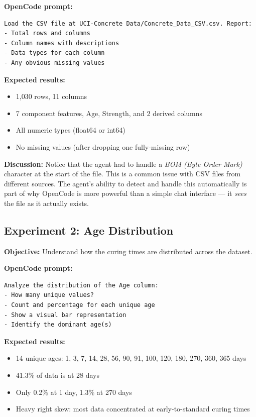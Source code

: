 \documentclass[11pt]{article}
\begin{document}
\textbf{OpenCode prompt:}
\begin{lstlisting}[style=term]
Load the CSV file at UCI-Concrete Data/Concrete_Data_CSV.csv. Report:
- Total rows and columns
- Column names with descriptions
- Data types for each column
- Any obvious missing values
\end{lstlisting}

\textbf{Expected results:}
\begin{itemize}[nosep]
  \item 1,030 rows, 11 columns
  \item 7 component features, Age, Strength, and 2 derived columns
  \item All numeric types (float64 or int64)
  \item No missing values (after dropping one fully-missing row)
\end{itemize}

\textbf{Discussion:}
Notice that the agent had to handle a \emph{BOM (Byte Order Mark)} character at the start of the file.  This is a common issue with CSV files from different sources.  The agent's ability to detect and handle this automatically is part of why OpenCode is more powerful than a simple chat interface --- it \emph{sees} the file as it actually exists.

\subsection{Experiment 2: Age Distribution}
\label{sec:experiment-2}

\textbf{Objective:} Understand how the curing times are distributed across the dataset.

\textbf{OpenCode prompt:}
\begin{lstlisting}[style=term]
Analyze the distribution of the Age column:
- How many unique values?
- Count and percentage for each unique age
- Show a visual bar representation
- Identify the dominant age(s)
\end{lstlisting}

\textbf{Expected results:}
\begin{itemize}[nosep]
  \item 14 unique ages: 1, 3, 7, 14, 28, 56, 90, 91, 100, 120, 180, 270, 360, 365 days
  \item 41.3\% of data is at 28 days
  \item Only 0.2\% at 1 day, 1.3\% at 270 days
  \item Heavy right skew: most data concentrated at early-to-standard curing times
\end{itemize}
\end{document}
